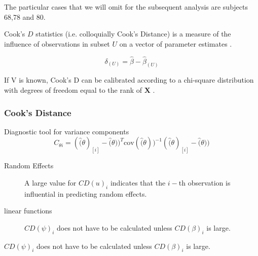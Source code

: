 \documentclass[12pt, a4paper]{report}
\theoremstyle{plain}
\theoremstyle{definition}
\theoremstyle{remark}
\begin{document}
The particular cases that we will omit for the subsequent analysis are subjects 68,78 and 80.
	
	
	

	 Cook's $D$ statistics (i.e. colloquially Cook's Distance) is a measure of the influence of observations in subset $U$ on a vector of parameter estimates \citep{cook77}.
	
	\[ \delta_{(U)} = \hat{\beta} - \hat{\beta}_{(U)}\]
	
	If V is known, Cook's D can be calibrated according to a chi-square distribution with degrees of freedom equal to the rank of $\boldsymbol{X}$ \citep{cpj92}.
	
	

	
	

	
	
	
	
	
\subsubsection{Cook's Distance}

Diagnostic tool for variance components
\[ C_{\theta i} =(\hat(\theta)_{[i]} - \hat(\theta))^{T}\mbox{cov}( \hat(\theta))^{-1}(\hat(\theta)_{[i]} - \hat(\theta))\]

\begin{description}
	\item[Random Effects]	
	A large value for $CD(u)_i$ indicates that the $i-$th observation is influential in predicting random effects.
	\item[linear functions]
	$CD(\psi)_i$ does not have to be calculated unless $CD(\beta)_i$ is large.
\end{description}


$CD(\psi)_i$ does not have to be calculated unless $CD(\beta)_i$ is large.




\end{document}
